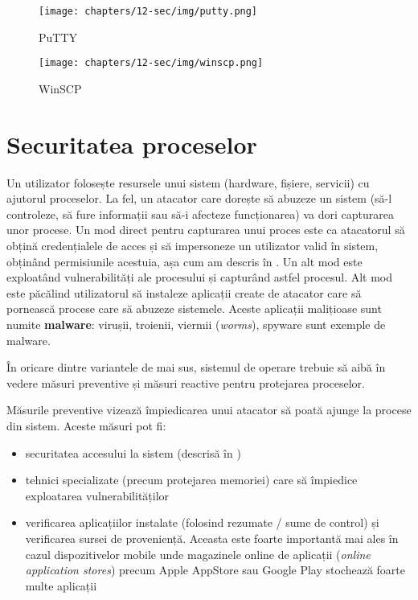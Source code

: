 \begin{figure}[!htbp]
  \centering
  \texttt{[image: chapters/12-sec/img/putty.png]}
  \caption{PuTTY}
  \label{fig:sec:putty}
\end{figure}

\begin{figure}[!htbp]
  \centering
  \texttt{[image: chapters/12-sec/img/winscp.png]}
  \caption{WinSCP}
  \label{fig:sec:winscp}
\end{figure}

\section{Securitatea proceselor}
\label{sec:sec:process}

Un utilizator folosește resursele unui sistem (hardware, fișiere, servicii) cu ajutorul proceselor. La fel, un atacator care dorește să abuzeze un sistem (să-l controleze, să fure informații sau să-i afecteze funcționarea) va dori capturarea unor procese. Un mod direct pentru capturarea unui proces este ca atacatorul să obțină credențialele de acces și să impersoneze un utilizator valid în sistem, obținând permisiunile acestuia, așa cum am descris în . Un alt mod este exploatând vulnerabilități ale procesului și capturând astfel procesul. Alt mod este păcălind utilizatorul să instaleze aplicații create de atacator care să pornească procese care să abuzeze sistemele. Aceste aplicații malițioase sunt numite \textbf{malware}: virușii, troienii, viermii (\textit{worms}), spyware sunt exemple de malware.

În oricare dintre variantele de mai sus, sistemul de operare trebuie să aibă în vedere măsuri preventive și măsuri reactive pentru protejarea proceselor.

Măsurile preventive vizează împiedicarea unui atacator să poată ajunge la procese din sistem. Aceste măsuri pot fi:

\begin{itemize}
  \item securitatea accesului la sistem (descrisă în )
  \item tehnici specializate (precum protejarea memoriei) care să împiedice exploatarea vulnerabilităților
  \item verificarea aplicațiilor instalate (folosind rezumate / sume de control) și verificarea sursei de proveniență. Aceasta este foarte importantă mai ales în cazul dispozitivelor mobile unde magazinele online de aplicații (\textit{online application stores}) precum Apple AppStore sau Google Play stochează foarte multe aplicații
\end{itemize}

